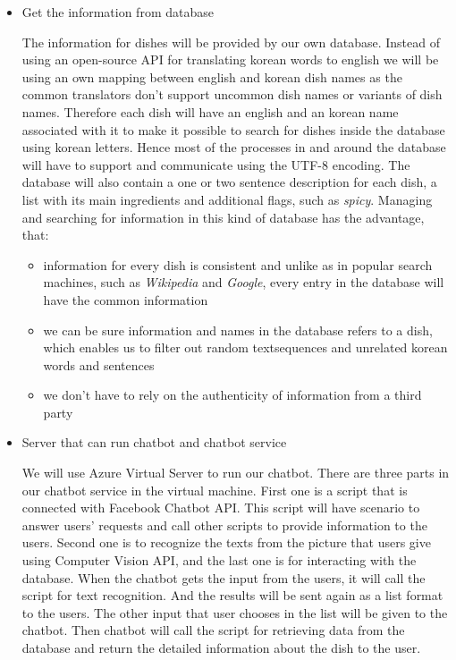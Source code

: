 \begin{itemize}
\item Get the information from database

The information for dishes will be provided by our own database. Instead of using an open-source API for translating korean words to english we will be using an own mapping between english and korean dish names as the common translators don't support uncommon dish names or variants of dish names. Therefore each dish will have an english and an korean name associated with it to make it possible to search for dishes inside the database using korean letters. Hence most of the processes in and around the database will have to support and communicate using the UTF-8 encoding. The database will also contain a one or two sentence description for each dish, a list with its main ingredients and additional flags, such as \emph{spicy}. Managing and searching for information in this kind of database has the advantage, that:

    \begin{itemize}
    \item information for every dish is consistent and unlike as in popular search machines, such as \emph{Wikipedia} and \emph{Google}, every entry in the database will have the common information
    \item we can be sure information and names in the database refers to a dish, which enables us to filter out random textsequences and unrelated korean words and sentences
    \item we don't have to rely on the authenticity of information from a third party
    \end{itemize}

\item Server that can run chatbot and chatbot service

We will use Azure Virtual Server to run our chatbot. There are three parts in our chatbot service in the virtual machine. First one is a script that is connected with Facebook Chatbot API. This script will have scenario to answer users' requests and call other scripts to provide information to the users. Second one is to recognize the texts from the picture that users give using Computer Vision API, and the last one is for interacting with the database. When the chatbot gets the input from the users, it will call the script for text recognition. And the results will be sent again as a list format to the users. The other input that user chooses in the list will be given to the chatbot. Then chatbot will call the script for retrieving data from the database and return the detailed information about the dish to the user.


\end{itemize}
